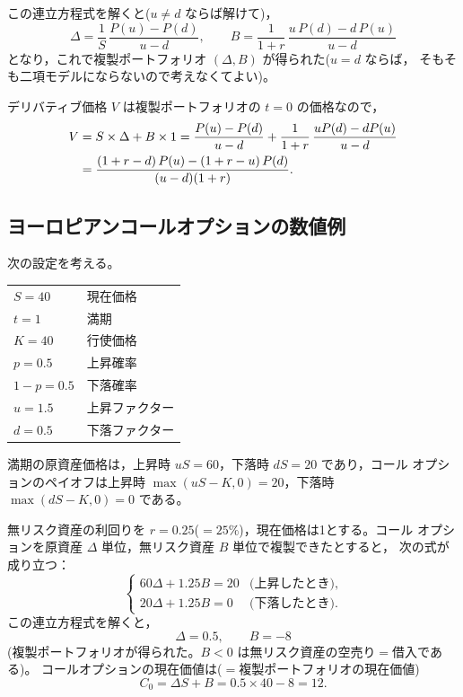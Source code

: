 この連立方程式を解くと($u\neq d$ ならば解けて)，
\begin{equation}
\Delta = \frac{1}{S}\,\frac{P(u) - P(d)}{u - d},
\qquad
B = \frac{1}{1+r}\,\frac{u\,P(d) - d\,P(u)}{u - d}
\label{eq:delta-B}
\end{equation}
となり，これで複製ポートフォリオ $(\Delta, B)$ が得られた($u=d$ ならば，
そもそも二項モデルにならないので考えなくてよい)。

デリバティブ価格 $V$ は複製ポートフォリオの $t=0$ の価格なので，
\begin{align}
V &= S\times\Delta + B\times 1
= \frac{P(u)-P(d)}{u-d} + \frac{1}{1+r}\,\frac{uP(d) - dP(u)}{u-d}\notag\\
&= \frac{(1+r-d)\,P(u) - (1+r-u)\,P(d)}{(u-d)(1+r)}.
\label{eq:binomial-price}
\end{align}

\subsection{ヨーロピアンコールオプションの数値例}

\begin{example}
次の設定を考える。
\vspace{0.9em}
\begin{center}
\begin{tabular}{ll}
\toprule
$S = 40$ & 現在価格\\
$t = 1$ & 満期\\
$K = 40$ & 行使価格\\
$p = 0.5$ & 上昇確率\\
$1-p = 0.5$ & 下落確率\\
$u = 1.5$ & 上昇ファクター\\
$d = 0.5$ & 下落ファクター\\
\bottomrule
\end{tabular}
\end{center}
\vspace{0.9em}
満期の原資産価格は，上昇時 $uS = 60$，下落時 $dS = 20$ であり，コール
オプションのペイオフは上昇時 $\max(uS-K,0) = 20$，下落時 $\max(dS-K,0) = 0$
である。

無リスク資産の利回りを $r = 0.25$($=25\%$)，現在価格は1とする。コール
オプションを原資産 $\Delta$ 単位，無リスク資産 $B$ 単位で複製できたとすると，
次の式が成り立つ：
\[
\begin{cases}
60\Delta + 1.25B = 20 & \text{(上昇したとき)},\\
20\Delta + 1.25B = 0 & \text{(下落したとき)}.
\end{cases}
\]
この連立方程式を解くと，
\[
\Delta = 0.5,\qquad B = -8
\]
(複製ポートフォリオが得られた。$B<0$ は無リスク資産の空売り$=$借入である)。
コールオプションの現在価値は($=$複製ポートフォリオの現在価値)
\[
C_0 = \Delta S + B = 0.5\times 40 - 8 = 12.
\]
\end{example}

